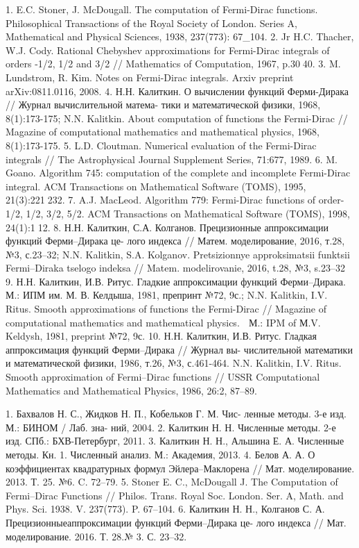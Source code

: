 1. E.C. Stoner, J. McDougall. The computation of Fermi-Dirac functions. Philosophical Transactions
of the Royal Society of London. Series A, Mathematical and Physical Sciences, 1938, 237(773):
67_104.
2. Jr H.C. Thacher, W.J. Cody. Rational Chebyshev approximations for Fermi-Dirac integrals of orders
-1/2, 1/2 and 3/2 // Mathematics of Computation, 1967, p.3040.
3. M. Lundstrom, R. Kim. Notes on Fermi-Dirac integrals. Arxiv preprint arXiv:0811.0116, 2008.
4. Н.Н. Калиткин. О вычислении функций Ферми-Дирака // Журнал вычислительной матема-
тики и математической физики, 1968, 8(1):173-175;
N.N. Kalitkin. About computation of functions the Fermi-Dirac // Magazine of computational
mathematics and mathematical physics, 1968, 8(1):173-175.
5. L.D. Cloutman. Numerical evaluation of the Fermi-Dirac integrals // The Astrophysical Journal
Supplement Series, 71:677, 1989.
6. M. Goano. Algorithm 745: computation of the complete and incomplete Fermi-Dirac integral.
ACM Transactions on Mathematical Software (TOMS), 1995, 21(3):221232.
7. A.J. MacLeod. Algorithm 779: Fermi-Dirac functions of order-1/2, 1/2, 3/2, 5/2. ACM Transactions
on Mathematical Software (TOMS), 1998, 24(1):112.
8. Н.Н. Калиткин, С.А. Колганов. Прецизионные аппроксимации функций Ферми–Дирака це-
лого индекса // Матем. моделирование, 2016, т.28, №3, с.23–32;
N.N. Kalitkin, S.A. Kolganov. Pretsizionnye approksimatsii funktsii Fermi–Diraka tselogo indeksa
// Matem. modelirovanie, 2016, t.28, №3, s.23–32
9. Н.Н. Калиткин, И.В. Ритус. Гладкие аппроксимации функций Ферми–Дирака.  М.: ИПМ
им. М. В. Келдыша, 1981, препринт №72, 9с.;
N.N. Kalitkin, I.V. Ritus. Smooth approximations of functions the Fermi-Dirac // Magazine of computational
mathematics and mathematical physics.  М.: IPM of М.V. Keldysh, 1981, preprint
№72, 9с.
10. Н.Н. Калиткин, И.В. Ритус. Гладкая аппроксимация функций Ферми–Дирака // Журнал вы-
числительной математики и математической физики, 1986, т.26, №3, с.461-464.
N.N. Kalitkin, I.V. Ritus. Smooth approximation of Fermi–Dirac functions // USSR Computational
Mathematics and Mathematical Physics, 1986, 26:2, 87–89.

1. Бахвалов Н. С., Жидков Н. П., Кобельков Г. М. Чис-
ленные методы. 3-е изд. М.: БИНОМ / Лаб. зна-
ний, 2004.
2. Калиткин Н. Н. Численные методы. 2-е изд. СПб.: БХВ-Петербург, 2011.
3. Калиткин Н. Н., Альшина Е. А. Численные методы. Кн. 1. Численный анализ. М.: Академия, 2013.
4. Белов А. А. О коэффициентах квадратурных формул Эйлера–Маклорена // Мат. моделирование. 2013. Т. 25. №6. C. 72–79.
5. Stoner E. C., McDougall J. The Computation of Fermi–Dirac Functions // Philos. Trans. Royal Soc.
London. Ser. A, Math. and Phys. Sci. 1938. V. 237(773). P. 67–104.
6. Калиткин Н. Н., Колганов С. А. Прецизионныеаппроксимации функций Ферми–Дирака це-
лого индекса // Мат. моделирование. 2016. Т. 28.№ 3. С. 23–32.

